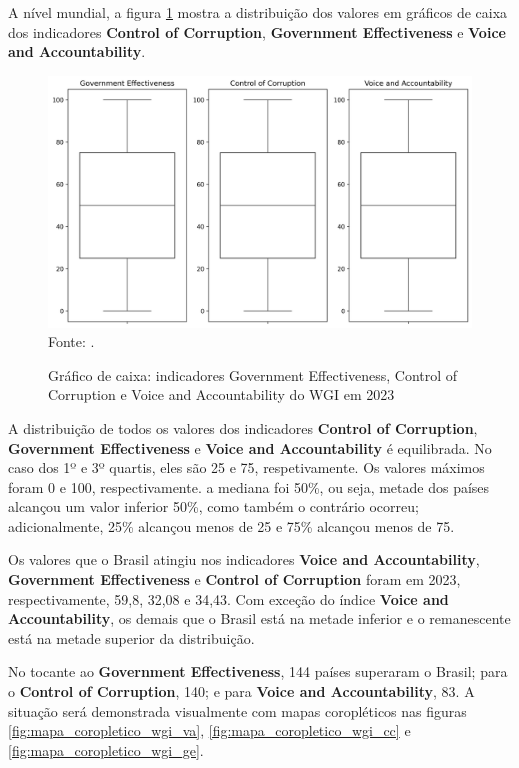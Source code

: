 A nível mundial, a figura \ref{fig:quartis_wgi_ge_cc_va} mostra a distribuição dos valores em gráficos de caixa dos indicadores \textbf{Control of Corruption}, \textbf{Government Effectiveness} e \textbf{Voice and Accountability}.

\begin{figure}[H]
	\centering
	\caption{Gráfico de caixa: indicadores Government Effectiveness, Control of Corruption e Voice and Accountability do WGI em 2023}
	\includegraphics[width=1\linewidth]{figuras/quartis_wgi_ge_cc_va}
	\label{fig:quartis_wgi_ge_cc_va}
	\footnotesize{Fonte: \cite{wgi_dados}.}
\end{figure}

A distribuição de todos os valores dos indicadores \textbf{Control of Corruption}, \textbf{Government Effectiveness} e \textbf{Voice and Accountability} é equilibrada. No caso dos 1º e 3º quartis, eles são 25 e 75, respetivamente. Os valores máximos foram 0 e 100, respectivamente.  a mediana foi 50\%, ou seja, metade dos países alcançou um valor inferior 50\%, como também o contrário ocorreu; adicionalmente, 25\% alcançou menos de 25 e 75\% alcançou menos de 75.

Os valores que o Brasil atingiu nos indicadores \textbf{Voice and Accountability}, \textbf{Government Effectiveness} e \textbf{Control of Corruption} foram em 2023, respectivamente, 59,8, 32,08 e 34,43. Com exceção do índice \textbf{Voice and Accountability}, os demais que o Brasil está na metade inferior e o remanescente está na metade superior da distribuição.

No tocante ao \textbf{Government Effectiveness}, 144 países superaram o Brasil; para o \textbf{Control of Corruption}, 140; e para \textbf{Voice and Accountability}, 83. A situação será demonstrada visualmente com mapas coropléticos nas figuras \ref{fig:mapa_coropletico_wgi_va}, \ref{fig:mapa_coropletico_wgi_cc} e \ref{fig:mapa_coropletico_wgi_ge}.

